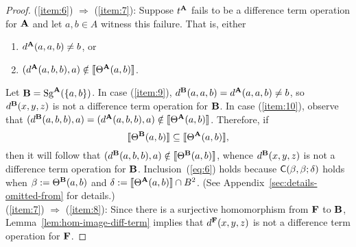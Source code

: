 \begin{proof}
  (\ref{item:6}) $\Rightarrow $ (\ref{item:7}):
  Suppose  $t^{\mathbf{A}}$ fails to be a difference term operation for $\mathbf{A}$ and let $a, b \in
  A$ witness this failure. That is, either
  \begin{enumerate}
  \item\label{item:9} $d^{\mathbf{A}}(a,a,b) \neq b$, or
  \item\label{item:10} $(d^{\mathbf{A}}(a,b,b), a) \notin \llbracket \Theta^{\mathbf{A}} (a, b) \rrbracket$.
  \end{enumerate}
  Let $\mathbf{B} = \operatorname{Sg}^{\mathbf{A}} (\{a, b\})$.  In case
  (\ref{item:9}), 
  $d^{\mathbf{B}}(a,a,b) = d^{\mathbf{A}}(a,a,b) \neq b$, so $d^{\mathbf{B}}(x,y,z)$ is not a difference
  term operation for $\mathbf{B}$.
  In case (\ref{item:10}), observe that
  $(d^{\mathbf{B}}(a,b,b), a) = (d^{\mathbf{A}}(a,b,b), a)\notin \llbracket \Theta^{\mathbf{A}} (a, b) \rrbracket$.
  Therefore, if
  \begin{equation}
    \label{eq:6}
    \com{\Cg^{\bB} (a, b)} \subseteq \com{\Cg^{\bA} (a, b)},
  \end{equation}
  then it will follow that $(d^{\mathbf{B}}(a,b,b), a) \notin \llbracket \Theta^{\mathbf{B}} (a, b) \rrbracket$,
  whence $d^{\mathbf{B}}(x,y,z)$ is not a difference term operation for $\mathbf{B}$.
  Inclusion~(\ref{eq:6}) holds because 
  $\mathsf{C}(\beta, \beta; \delta)$ holds when
  $\beta := \Theta^{\mathbf{B}} (a, b)$ and
  $\delta:=\llbracket \Theta^{\mathbf{A}} (a, b) \rrbracket \cap B^2$.
  (See Appendix~\ref{sec:details-omitted-from} for details.)\\[5pt]
  (\ref{item:7}) $\Rightarrow$ (\ref{item:8}):
  Since there is a surjective homomorphism from $\mathbf{F}$ to $\mathbf{B}$,
  Lemma~\ref{lem:hom-image-diff-term} implies that $d^{\mathbf{F}}(x,y,z)$ 
  is not a difference term operation for $\mathbf{F}$.
\end{proof}

\smallskip



